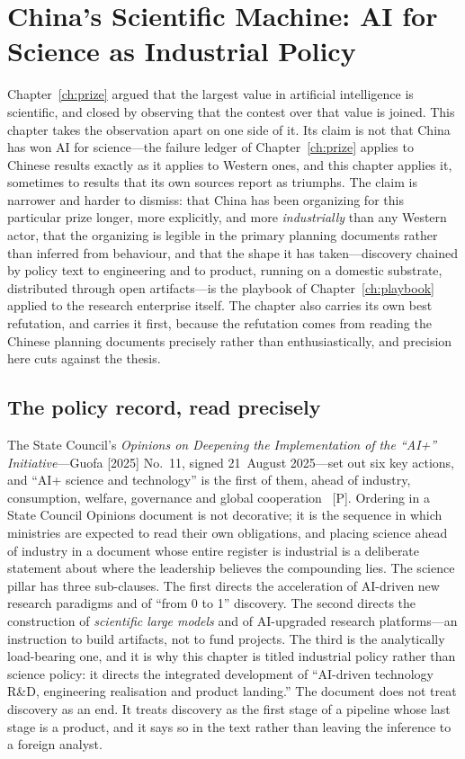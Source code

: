 \chapter{China's Scientific Machine: AI for Science as Industrial Policy}
\label{ch:china-ai4s}

Chapter~\ref{ch:prize} argued that the largest value in artificial intelligence is scientific, and closed by observing that the contest over that value is joined. This chapter takes the observation apart on one side of it. Its claim is not that China has won AI for science---the failure ledger of Chapter~\ref{ch:prize} applies to Chinese results exactly as it applies to Western ones, and this chapter applies it, sometimes to results that its own sources report as triumphs. The claim is narrower and harder to dismiss: that China has been organizing for this particular prize longer, more explicitly, and more \emph{industrially} than any Western actor, that the organizing is legible in the primary planning documents rather than inferred from behaviour, and that the shape it has taken---discovery chained by policy text to engineering and to product, running on a domestic substrate, distributed through open artifacts---is the playbook of Chapter~\ref{ch:playbook} applied to the research enterprise itself. The chapter also carries its own best refutation, and carries it first, because the refutation comes from reading the Chinese planning documents precisely rather than enthusiastically, and precision here cuts against the thesis.

\section{The policy record, read precisely}
\label{sec:china-ai4s-policy}

The State Council's \emph{Opinions on Deepening the Implementation of the ``AI+'' Initiative}---Guofa [2025] No.~11, signed 21~August 2025---set out six key actions, and ``AI+ science and technology'' is the first of them, ahead of industry, consumption, welfare, governance and global cooperation~\cite{ai-plus-science} [P]. Ordering in a State Council Opinions document is not decorative; it is the sequence in which ministries are expected to read their own obligations, and placing science ahead of industry in a document whose entire register is industrial is a deliberate statement about where the leadership believes the compounding lies. The science pillar has three sub-clauses. The first directs the acceleration of AI-driven new research paradigms and of ``from 0 to 1'' discovery. The second directs the construction of \emph{scientific large models} and of AI-upgraded research platforms---an instruction to build artifacts, not to fund projects. The third is the analytically load-bearing one, and it is why this chapter is titled industrial policy rather than science policy: it directs the integrated development of ``AI-driven technology R\&D, engineering realisation and product landing.'' The document does not treat discovery as an end. It treats discovery as the first stage of a pipeline whose last stage is a product, and it says so in the text rather than leaving the inference to a foreign analyst.

